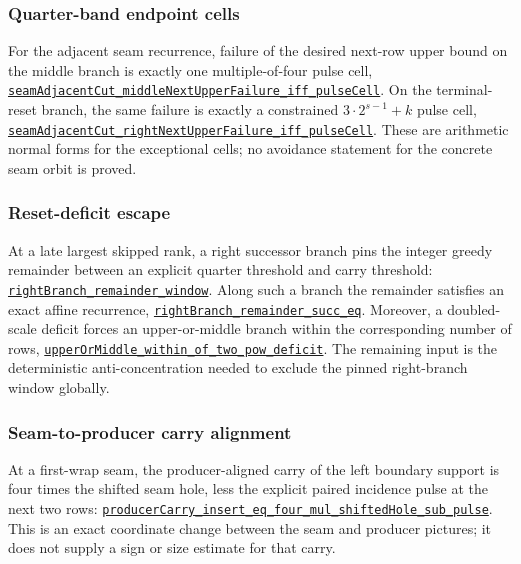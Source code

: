 \documentclass[11pt]{article}
\newcommand{\commit}{81150c1c6fdd4cd51e76d3aa0de344341e0e9e7c}
\newcommand{\repobase}{https://github.com/wcook04/plectis-lean-erdos249-257/blob/\commit}
\newcommand{\PK}{Erdos249257}
\newcommand{\lref}[3]{\href{\repobase/\PK/#1\#L#2}{\nolinkurl{#3}}}
\newcommand{\lrefx}[3]{\href{\repobase/\PK/#1\#L#2}{\nolinkurl{#3}}}
\theoremstyle{definition}
\theoremstyle{remark}
\begin{document}
\subsubsection{Quarter-band endpoint cells}\label{res:quarterband}

For the adjacent seam recurrence, failure of the desired next-row upper bound
on the middle branch is exactly one multiple-of-four pulse cell,
\lref{HalfCylinderQuarterBandEndpoints.lean}{153}{seamAdjacentCut_middleNextUpperFailure_iff_pulseCell}.
On the terminal-reset branch, the same failure is exactly a constrained
$3\cdot2^{s-1}+k$ pulse cell,
\lrefx{HalfCylinderQuarterBandEndpoints.lean}{175}{seamAdjacentCut_rightNextUpperFailure_iff_pulseCell}.
These are arithmetic normal forms for the exceptional cells; no avoidance
statement for the concrete seam orbit is proved.

\subsubsection{Reset-deficit escape}\label{res:resetdeficit}

At a late largest skipped rank, a right successor branch pins the integer
greedy remainder between an explicit quarter threshold and carry threshold:
\lref{HalfCylinderResetDeficitEscape.lean}{200}{rightBranch_remainder_window}.
Along such a branch the remainder satisfies an exact affine recurrence,
\lrefx{HalfCylinderResetDeficitEscape.lean}{218}{rightBranch_remainder_succ_eq}.
Moreover, a doubled-scale deficit forces an upper-or-middle branch within the
corresponding number of rows,
\lrefx{HalfCylinderResetDeficitEscape.lean}{261}{upperOrMiddle_within_of_two_pow_deficit}.
The remaining input is the deterministic anti-concentration needed to exclude
the pinned right-branch window globally.

\subsubsection{Seam-to-producer carry alignment}\label{res:seamproducer}

At a first-wrap seam, the producer-aligned carry of the left boundary support
is four times the shifted seam hole, less the explicit paired incidence pulse
at the next two rows:
\lref{HalfCylinderSeamProducerAlignment.lean}{24}{producerCarry_insert_eq_four_mul_shiftedHole_sub_pulse}.
This is an exact coordinate change between the seam and producer pictures; it
does not supply a sign or size estimate for that carry.
\end{document}
